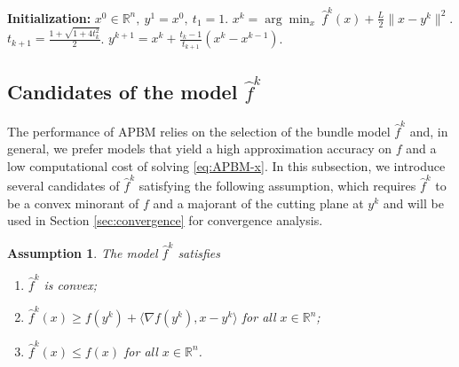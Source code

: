 \documentclass[letterpaper, 10 pt, conference]{ieeeconf}  %
\newtheorem{assumption}{Assumption}  %
\newcommand{\R}{{\mathbb{R}}}
\begin{document}
 \begin{algorithm}[t]
\caption{Accelerated Proximal Bundle Method (APBM)}\label{algo:APBM}
\begin{algorithmic}[1]
\State \textbf{Initialization:} $x^0 \in \mathbb{R}^n,~y^1 = x^0,~t_1=1$. 
\vspace{0.2cm}
\State $x^k = \arg\min_x ~\hat{f}^k(x)+ \frac{L}{2}\|x-y^k\|^2$.
\vspace{0.2cm}
\State $t_{k+1} = \frac{1+ \sqrt{1+4t_k^2}}{2}$.
\vspace{0.2cm}
\State $ y^{k+1} = x^k  + \frac{t_k-1}{t_{k+1}}(x^k-x^{k-1})$.
\vspace{0.2cm}
\EndFor
\end{algorithmic}
\end{algorithm}

\subsection{Candidates of the model $\hat{f}^k$}\label{ssec:candidates}

The performance of APBM relies on the selection of the bundle model $\hat{f}^k$ and, in general, we prefer models that yield a high approximation accuracy on $f$ and a low computational cost of solving \eqref{eq:APBM-x}. In this subsection, we introduce several candidates of $\hat{f}^k$ satisfying the following assumption, which requires $\hat{f}^k$ to be a convex minorant of $f$ and a majorant of the cutting plane at $y^k$ and will be used in Section \ref{sec:convergence} for convergence analysis.
\begin{assumption}\label{asm:pri_model}
    The model $\hat{f}^k$ satisfies
    \begin{enumerate}[label=(\alph*)]
    \item $\hat{f}^k$ is convex;\label{primal model assumption a}
    \item $\hat {f}^k(x) \geq f(y^k) + \langle \nabla f(y^k),x-y^k\rangle$ for all $x\in\R^n$;\label{primal model assumption b}
    \item $\hat{f}^k(x)\leq f(x)$ for all $x\in\R^n$.\label{primal model assumption c}
    \end{enumerate}
\end{assumption}
\end{document}
